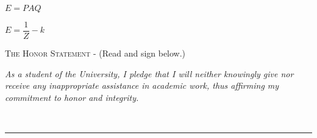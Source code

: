 \begin{enumerate}[label=\textbf{\Alph*.}]
\bigskip 

\begin{minipage}{.3\textwidth}
\item \(E = PAQ\)\\
\end{minipage}
\begin{minipage}{.3\textwidth}
\item \(E = \dfrac{1}{Z}-k\)\\
\end{minipage}
\end{enumerate}

\bigskip

\noindent \textsc{The Honor Statement} - (Read and sign below.)\\
\begin{footnotesize}
\textit{As a student of the University, I pledge that I will neither knowingly give nor receive any inappropriate assistance in academic work, thus affirming my commitment to honor and integrity.}\\
\end{footnotesize}

 \ \rule{8.75 cm}{.01cm}\\

\vfill
